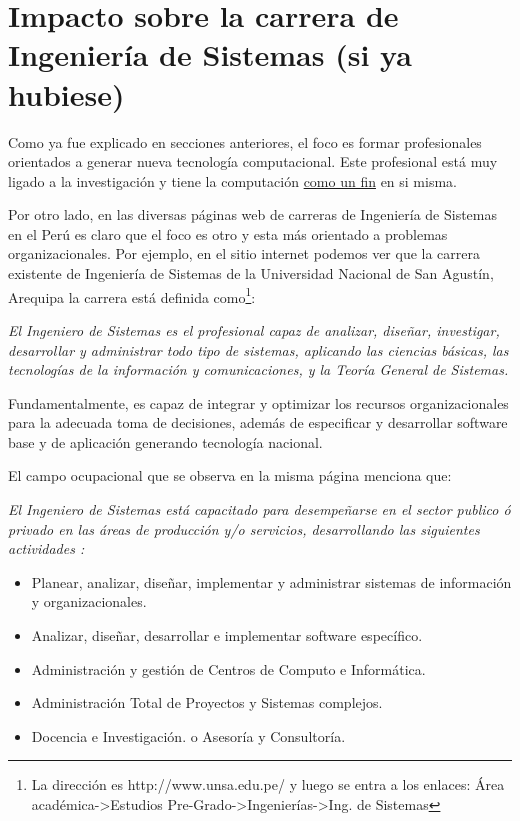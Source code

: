 \section{Impacto sobre la carrera de Ingenierí­a de Sistemas (si ya hubiese)}\label{sec:impacto-en-sistemas}
Como ya fue explicado en secciones anteriores, el foco es formar
profesionales orientados a generar nueva tecnologí­a computacional.
Este profesional está muy ligado a la investigación y tiene la
computación \underline{como un fin} en si misma.

Por otro lado, en las diversas páginas web de carreras de Ingenierí­a de Sistemas en el Perú es claro que el foco es otro y esta más orientado a problemas organizacionales. 
Por ejemplo, en el sitio internet podemos ver que la carrera
existente de Ingenierí­a de Sistemas de la Universidad Nacional de San Agustí­n, Arequipa la carrera está definida como\footnote{La
dirección es http://www.unsa.edu.pe/ y luego se entra a los enlaces:
Área académica->Estudios Pre-Grado->Ingenierí­as->Ing. de Sistemas}:

{\it El Ingeniero de Sistemas es el profesional capaz de analizar, diseñar, investigar, desarrollar y 
administrar todo tipo de sistemas, aplicando las ciencias básicas, las tecnologí­as de la 
información y comunicaciones, y la Teorí­a General de Sistemas.

Fundamentalmente, es capaz de integrar y optimizar los recursos organizacionales para la adecuada 
toma de decisiones, además de especificar y desarrollar software base y de aplicación generando tecnologí­a nacional.}

El campo ocupacional que se observa en la misma página menciona que:

{\it El Ingeniero de Sistemas está capacitado para desempeñarse en el sector publico ó privado en las 
áreas de producción y/o servicios, desarrollando las siguientes actividades :

\begin{itemize}
    \item Planear, analizar, diseñar, implementar y administrar sistemas de información y organizacionales.
    \item Analizar, diseñar, desarrollar e implementar software especí­fico.
    \item Administración y gestión de Centros de Computo e Informática.
    \item Administración Total de Proyectos y Sistemas complejos.
    \item Docencia e Investigación. o Asesorí­a y Consultorí­a.
\end{itemize}
}

